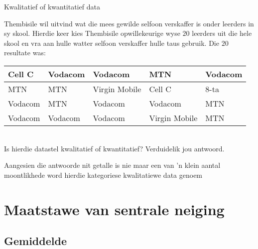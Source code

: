 \begin{wex}{Kwalitatief of kwantitatief data}
{Thembisile wil uitvind wat die mees gewilde selfoon verskaffer is onder leerders in sy skool. Hierdie keer kies Thembisile opwillekeurige wyse $20$ leerders uit die hele skool en vra aan hulle watter selfoon verskaffer hulle taus gebruik.
 Die $20$ resultate was:

    \begin{center}
      \begin{tabular}{|p{}|p{}|p{}|p{}|p{}|}\hline
        
        Cell C & Vodacom & Vodacom & MTN & Vodacom \\\hline
        MTN & MTN & Virgin Mobile & Cell C & 8-ta \\\hline
        Vodacom & MTN & Vodacom & Vodacom & MTN \\\hline
        Vodacom & Vodacom & Vodacom & Virgin Mobile & MTN \\\hline
      \end{tabular}
    \end{center}
\vspace{8pt}\\
    Is hierdie datastel kwalitatief of kwantitatief? Verduidelik jou antwoord.
}{
  Aangesien die antwoorde nit getalle is nie maar een van 'n klein aantal moontlikhede word hierdie kategoriese kwalitatiewe data genoem
}
\end{wex}

\section{Maatstawe van sentrale neiging}

\subsection{Gemiddelde}


